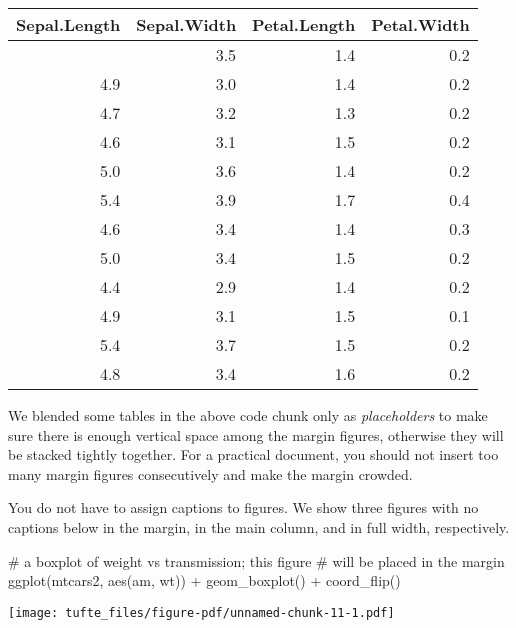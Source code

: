 \documentclass[
  letterpaper,
  DIV=11,
  numbers=noendperiod,
  oneside]{scrartcl}
\newenvironment{Shaded}{\begin{snugshade}}{\end{snugshade}}
\newcommand{\CommentTok}[1]{\textcolor[rgb]{0.37,0.37,0.37}{#1}}
\newcommand{\FunctionTok}[1]{\textcolor[rgb]{0.28,0.35,0.67}{#1}}
\newcommand{\NormalTok}[1]{\textcolor[rgb]{0.00,0.23,0.31}{#1}}
\newcommand{\SpecialCharTok}[1]{\textcolor[rgb]{0.37,0.37,0.37}{#1}}
\begin{document}
\begin{longtable}[]{@{}rrrr@{}}
\toprule\noalign{}
Sepal.Length & Sepal.Width & Petal.Length & Petal.Width \\
\midrule\noalign{}
\endhead
\bottomrule\noalign{}
\endlastfoot
5.1 & 3.5 & 1.4 & 0.2 \\
4.9 & 3.0 & 1.4 & 0.2 \\
4.7 & 3.2 & 1.3 & 0.2 \\
4.6 & 3.1 & 1.5 & 0.2 \\
5.0 & 3.6 & 1.4 & 0.2 \\
5.4 & 3.9 & 1.7 & 0.4 \\
4.6 & 3.4 & 1.4 & 0.3 \\
5.0 & 3.4 & 1.5 & 0.2 \\
4.4 & 2.9 & 1.4 & 0.2 \\
4.9 & 3.1 & 1.5 & 0.1 \\
5.4 & 3.7 & 1.5 & 0.2 \\
4.8 & 3.4 & 1.6 & 0.2 \\
\end{longtable}

We blended some tables in the above code chunk only as
\emph{placeholders} to make sure there is enough vertical space among
the margin figures, otherwise they will be stacked tightly together. For
a practical document, you should not insert too many margin figures
consecutively and make the margin crowded.

You do not have to assign captions to figures. We show three figures
with no captions below in the margin, in the main column, and in full
width, respectively.

\begin{Shaded}
\begin{Highlighting}[]
\CommentTok{\# a boxplot of weight vs transmission; this figure}
\CommentTok{\# will be placed in the margin}
\FunctionTok{ggplot}\NormalTok{(mtcars2, }\FunctionTok{aes}\NormalTok{(am, wt)) }\SpecialCharTok{+} \FunctionTok{geom\_boxplot}\NormalTok{() }\SpecialCharTok{+}
  \FunctionTok{coord\_flip}\NormalTok{()}
\end{Highlighting}
\end{Shaded}

\begin{marginfigure}

{\centering \texttt{[image: tufte\_files/figure-pdf/unnamed-chunk-11-1.pdf]}

}

\end{marginfigure}
\end{document}
